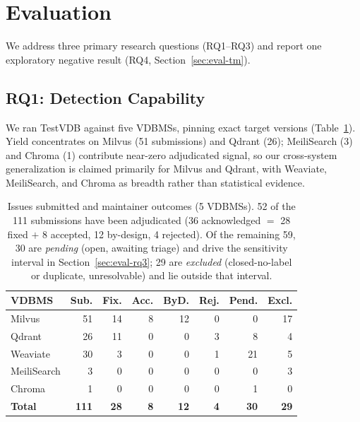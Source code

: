 \documentclass[sigconf]{acmart}
\begin{document}
\section{Evaluation}\label{sec:eval}

We address three primary research questions (RQ1--RQ3) and report one exploratory negative result (RQ4, Section~\ref{sec:eval-tm}).

\subsection{RQ1: Detection Capability}
We ran TestVDB against five VDBMSs, pinning exact target versions (Table~\ref{tab:yield}). Yield concentrates on Milvus (51 submissions) and Qdrant (26); MeiliSearch (3) and Chroma (1) contribute near-zero adjudicated signal, so our cross-system generalization is claimed primarily for Milvus and Qdrant, with Weaviate, MeiliSearch, and Chroma as breadth rather than statistical evidence.

\begin{table}[t]
\caption{Issues submitted and maintainer outcomes (5 VDBMSs). 52 of the 111 submissions have been adjudicated (36 acknowledged $=$ 28 fixed $+$ 8 accepted, 12 by-design, 4 rejected). Of the remaining 59, 30 are \emph{pending} (open, awaiting triage) and drive the sensitivity interval in Section~\ref{sec:eval-rq3}; 29 are \emph{excluded} (closed-no-label or duplicate, unresolvable) and lie outside that interval.}
\label{tab:yield}
\small
\begin{tabular}{lrrrrrrr}
\toprule
VDBMS & Sub. & Fix. & Acc. & ByD. & Rej. & Pend. & Excl. \\
\midrule
Milvus      & 51 & 14 & 8 & 12 & 0 & 0  & 17 \\
Qdrant      & 26 & 11 & 0 & 0  & 3 & 8  & 4 \\
Weaviate    & 30 & 3  & 0 & 0  & 1 & 21 & 5 \\
MeiliSearch & 3  & 0  & 0 & 0  & 0 & 0  & 3 \\
Chroma      & 1  & 0  & 0 & 0  & 0 & 1  & 0 \\
\midrule
\textbf{Total} & \textbf{111} & \textbf{28} & \textbf{8} & \textbf{12} & \textbf{4} & \textbf{30} & \textbf{29} \\
\bottomrule
\end{tabular}
\end{table}
\end{document}
